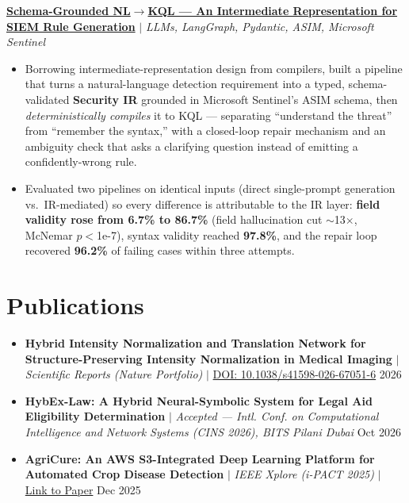 \documentclass[11pt,a4paper]{article}
\begin{document}
\vspace{3pt}

\href{https://github.com/mk12002/Intermediate-Representation-IR-Framework-for-SIEM-Rule-Generation}{\textbf{Schema-Grounded NL$\rightarrow$KQL — An Intermediate Representation for SIEM Rule Generation}} $|$ \textit{LLMs, LangGraph, Pydantic, ASIM, Microsoft Sentinel}
\begin{itemize}
    \item Borrowing intermediate-representation design from compilers, built a pipeline that turns a natural-language detection requirement into a typed, schema-validated \textbf{Security IR} grounded in Microsoft Sentinel's ASIM schema, then \textit{deterministically compiles} it to KQL — separating ``understand the threat'' from ``remember the syntax,'' with a closed-loop repair mechanism and an ambiguity check that asks a clarifying question instead of emitting a confidently-wrong rule.
    \item Evaluated two pipelines on identical inputs (direct single-prompt generation vs.\ IR-mediated) so every difference is attributable to the IR layer: \textbf{field validity rose from 6.7\% to 86.7\%} (field hallucination cut $\sim$13$\times$, McNemar $p<$1e-7), syntax validity reached \textbf{97.8\%}, and the repair loop recovered \textbf{96.2\%} of failing cases within three attempts.
\end{itemize}

\vspace{-2pt}

\section{Publications}
\vspace{-2pt}
\begin{itemize}
    \item \textbf{Hybrid Intensity Normalization and Translation Network for Structure-Preserving Intensity Normalization in Medical Imaging} $|$ \textit{Scientific Reports (Nature Portfolio)} $|$ \href{https://doi.org/10.1038/s41598-026-67051-6}{DOI: 10.1038/s41598-026-67051-6} \hfill 2026
    \item \textbf{HybEx-Law: A Hybrid Neural-Symbolic System for Legal Aid Eligibility Determination} $|$ \textit{Accepted --- Intl. Conf. on Computational Intelligence and Network Systems (CINS 2026), BITS Pilani Dubai} \hfill Oct 2026
    \item \textbf{AgriCure: An AWS S3-Integrated Deep Learning Platform for Automated Crop Disease Detection} $|$ \textit{IEEE Xplore (i-PACT 2025)} $|$ \href{https://ieeexplore.ieee.org/document/11307938}{Link to Paper} \hfill Dec 2025
\end{itemize}
\end{document}
